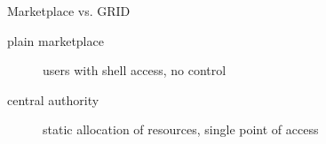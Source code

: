 {
\frame{}
}

{
\begin{frame}
\begin{block}{Marketplace vs. GRID}
	\begin{description}
		\item[plain marketplace]{users with shell access, no control}\pause
		\item[central authority]{static allocation of resources, single point of access}
	\end{description}
\end{block}
\end{frame}
}

